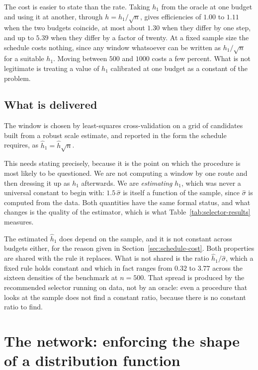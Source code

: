 \documentclass[11pt]{article}
\newcommand{\shat}{\hat{\sigma}}
\newcommand{\hhat}{\hat{h}}
\begin{document}
The cost is easier to state than the rate. Taking $h_1$ from the oracle at one budget and
using it at another, through $h = h_1/\sqrt{n}$, gives efficiencies of $1.00$ to $1.11$ when
the two budgets coincide, at most about $1.30$ when they differ by one step, and up to $5.39$
when they differ by a factor of twenty. At a fixed sample size the schedule costs nothing,
since any window whatsoever can be written as $h_1/\sqrt n$ for a suitable $h_1$. Moving
between $500$ and $1000$ costs a few percent. What is not legitimate is treating a value of
$h_1$ calibrated at one budget as a constant of the problem.

\subsection{What is delivered}

The window is chosen by least-squares cross-validation on a grid of candidates built from a
robust scale estimate, and reported in the form the schedule requires, as
$\hhat_1 = \hhat\sqrt n$.

This needs stating precisely, because it is the point on which the procedure is most likely
to be questioned. We are not computing a window by one route and then dressing it up
as $h_1$ afterwards. We are \emph{estimating} $h_1$, which was never a universal constant to
begin with: $1.5\,\shat$ is itself a function of the sample, since $\shat$ is computed from
the data. Both quantities have the same formal status, and what changes is the quality of the
estimator, which is what Table~\ref{tab:selector-results} measures.

The estimated $\hhat_1$ does depend on the sample, and it is not constant across budgets
either, for the reason given in Section~\ref{sec:schedule-cost}. Both properties are shared
with the rule it replaces. What is not shared is the ratio $\hhat_1/\shat$, which a fixed rule
holds constant and which in fact ranges from $0.32$ to $3.77$ across the sixteen
densities of the benchmark at $n = 500$. That spread is produced by the recommended selector
running on data, not by an oracle: even a procedure that looks at the sample does not find a
constant ratio, because there is no constant ratio to find.

\section{The network: enforcing the shape of a distribution function}
\label{sec:network}
\end{document}
